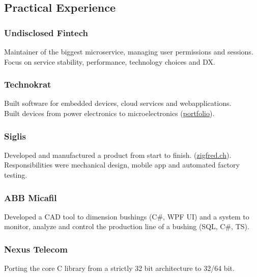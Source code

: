     \begin{timeline}
    
    
    \subsection{Practical Experience}

    \subsubsection{Undisclosed Fintech}
    Maintainer of the biggest microservice, managing user permissions and sessions.
    Focus on service stability, performance, technology choices and DX.
    \sectionsep
    
    \subsubsection{Technokrat}
    Built software for embedded devices, cloud services and webapplications.\\
    Built devices from power electronics to microelectronics (\href{https://technokrat.ch/portfolio}{portfolio}).
    \sectionsep

    \subsubsection{Siglis}
    Developed and manufactured a product from start to finish. (\href{https://zigfred.ch}{zigfred.ch}).
    Responsibilities were mechanical design, mobile app and automated factory testing.
    \sectionsep

    \subsubsection{ABB Micafil}
    Developed a CAD tool to dimension bushings (C\#, WPF UI) and a system to monitor, analyze and control the production line of a bushing (SQL, C\#, TS).
    \sectionsep
    
    \subsubsection{Nexus Telecom}
    Porting the core C library from a strictly 32 bit architecture to 32/64 bit.
    \sectionsep


\end{timeline}
